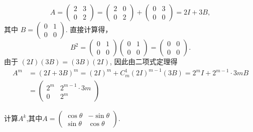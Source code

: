 \begin{solution}
    \[
A=\left(\begin{array}{ll}
2 & 3 \\
0 & 2
\end{array}\right)=\left(\begin{array}{ll}
2 & 0 \\
0 & 2
\end{array}\right)+\left(\begin{array}{ll}
0 & 3 \\
0 & 0
\end{array}\right)=2 I+3 B,
\]
其中 $B=\left(\begin{array}{ll}0 & 1 \\ 0 & 0\end{array}\right)$.
直接计算得，
\[
B^2=\left(\begin{array}{ll}
0 & 1 \\
0 & 0
\end{array}\right)\left(\begin{array}{ll}
0 & 1 \\
0 & 0
\end{array}\right)=\left(\begin{array}{ll}
0 & 0 \\
0 & 0
\end{array}\right) .
\]
由于 $(2 I)(3 B)=(3 B)(2 I)$, 因此由二项式定理得
\[
\begin{aligned}
A^m & =(2 I+3 B)^m=(2 I)^m+C_m^1(2 I)^{m-1}(3 B)=2^m I+2^{m-1} \cdot 3 m B \\
& =\left(\begin{array}{cc}
2^m & 2^{m-1} \cdot 3 m \\
0 & 2^m
\end{array}\right)
\end{aligned}
\]
\end{solution}

\begin{problem}
    计算$A^k$,其中$A=\begin{pmatrix}
        \cos \theta & -\sin \theta \\
        \sin \theta & \cos \theta
    \end{pmatrix}$.
\end{problem}

